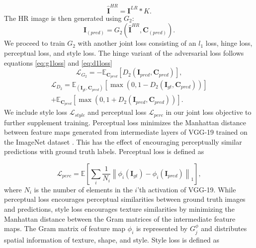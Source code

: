 \documentclass[10pt,twocolumn,letterpaper]{article}
\begin{document}
\begin{equation} 
    \mathbf{\hat{I}}^{HR} = \mathbf{I}^{LR} * K.
\end{equation}
The HR image is then generated using $G_2$:
\begin{equation}
    \mathbf{I}_{(pred)} = G_2(\mathbf{\hat{I}}^{HR}, \mathbf{C}_{(pred)}).
\end{equation}
We proceed to train $G_2$ with another joint loss consisting of an $l_1$ loss, hinge loss, perceptual loss, and style loss. The hinge variant of the adversarial loss follows equations \ref{eq:g1loss} and \ref{eq:d1loss}
\begin{equation}
	\mathcal{L}_{G_2} = - \mathbb{E}_{\mathbf{C}_{pred}} \left[ D_2 (\mathbf{I}_{pred}, \mathbf{C}_{pred}) \right],
\end{equation}
\begin{multline}
	\mathcal{L}_{D_2} = \mathbb{E}_{(\mathbf{I}_{gt},\mathbf{C}_{pred})} \left[ \max (0, 1 - D_2 (\mathbf{I}_{gt}, \mathbf{C}_{pred})) \right] \\
	+ \mathbb{E}_{\mathbf{C}_{pred}} \left[ \max (0, 1 + D_2 (\mathbf{I}_{pred}, \mathbf{C}_{pred})) \right].
\end{multline} 
We include style loss $\mathcal{L}_{style}$ and perceptual loss $\mathcal{L}_{perc}$ \cite{gatys2016image, johnson2016perceptual} in our joint loss objective to further supplement training. Perceptual loss minimizes the Manhattan distance between feature maps generated from intermediate layers of VGG-19 trained on the ImageNet dataset \cite{russakovsky2015imagenet}. This has the effect of encouraging perceptually similar predictions with ground truth labels. Perceptual loss is defined as 

\begin{equation}
	\mathcal{L}_{perc} = \mathbb{E} \left[ \sum_{i} \frac{1}{N_i} \left\lVert \phi_i (\mathbf{I}_{gt}) - \phi_i (\mathbf{I}_{pred}) \right \rVert_1 \right],
\end{equation}
where $N_i$ is the number of elements in the $i$'th activation of VGG-19. While perceptual loss encourages perceptual similarities between ground truth images and predictions, style loss encourages texture similarities by minimizing the Manhattan distance between the Gram matrices of the intermediate feature maps. The Gram matrix of feature map $\phi_{i}$ is represented by $G_{j}^{\phi}$ \cite{gatys2016image} and distributes spatial information of texture, shape, and style. Style loss is defined as 
\end{document}
